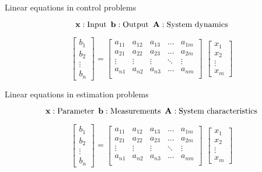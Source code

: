 \documentclass[aspectratio=169]{beamer}
\def\mf{\ensuremath\mathbf}
\begin{document}
\begin{frame}[t]{Linear equations in control problems}
\begin{LARGE}
\[ \mf{x}: \text{Input} \,\,\, \mf{b}: \text{Output} \,\,\, \mf{A}: \text{System dynamics} \]

\[ \begin{bmatrix}
b_1\\ b_2\\ \vdots \\ b_n
\end{bmatrix} = \begin{bmatrix}
a_{11} & a_{12} & a_{13} & \ldots & a_{1m}\\
a_{21} & a_{22} & a_{23} & \ldots & a_{2m}\\
\vdots & \vdots & \vdots & \ddots & \vdots\\
a_{n1} & a_{n2} & a_{n3} & \ldots & a_{nm}\\
\end{bmatrix} \,\, \begin{bmatrix}
x_1\\ x_2\\ \vdots \\ x_m
\end{bmatrix} \]
\end{LARGE}
\end{frame}


\begin{frame}[t]{Linear equations in estimation problems}
\begin{LARGE}
\[ \mf{x}: \text{Parameter} \,\,\, \mf{b}: \text{Measurements} \,\,\, \mf{A}: \text{System characteristics} \]

\[ \begin{bmatrix}
b_1\\ b_2\\ \vdots \\ b_n
\end{bmatrix} = \begin{bmatrix}
a_{11} & a_{12} & a_{13} & \ldots & a_{1m}\\
a_{21} & a_{22} & a_{23} & \ldots & a_{2m}\\
\vdots & \vdots & \vdots & \ddots & \vdots\\
a_{n1} & a_{n2} & a_{n3} & \ldots & a_{nm}\\
\end{bmatrix} \,\, \begin{bmatrix}
x_1\\ x_2\\ \vdots \\ x_m
\end{bmatrix} \]
\end{LARGE}
\end{frame}
\end{document}

